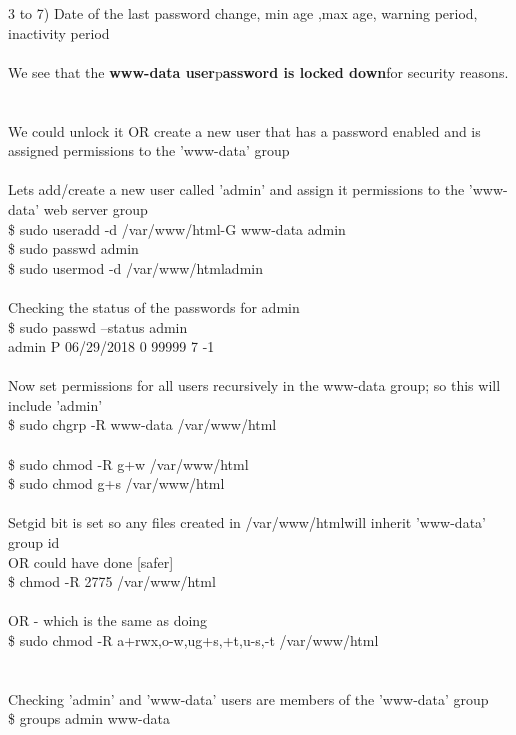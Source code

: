 \documentclass[10pt,a4paper]{article}
\begin{document}
{{{{{{{{{{{{{{{{{{{{{3 to 7) Date of the last password change, min age ,max age, warning period, inactivity period\\
\\
We see that the \textbf{www-data user}}{\large  p\textbf{assword is locked down}}{\large  for security reasons.\\
\\
\\
We could unlock it OR create a new user that has a password enabled and is assigned permissions to the 'www-data' group\\
\\
Lets add/create a new user called 'admin' and assign it permissions to the 'www-data' web server group\\
\$ sudo useradd -d /var/www/html}{\large  -G www-data admin\\
\$ sudo passwd admin\\
\$ sudo usermod -d /var/www/html}{\large  admin\\
\\
Checking the status of the passwords for admin\\
\$ sudo passwd --status admin\\
admin P 06/29/2018 0 99999 7 -1\\
\\
Now set permissions for all users recursively in the www-data group; so this will include 'admin'\\
\$ sudo chgrp -R www-data /var/www/html}{\large \\
\\
\$ sudo chmod -R g+w /var/www/html}{\large \\
\$ sudo chmod g+s /var/www/html}{\large \\
\\
Setgid bit is set so any files created in /var/www/html}{\large  will inherit 'www-data' group id\\
OR could have done [safer]\\
\$ chmod -R 2775 /var/www/html}{\large \\
\\
OR - which is the same as doing\\
\$ sudo chmod -R a+rwx,o-w,ug+s,+t,u-s,-t  /var/www/html}{\large \\
\\
\\
Checking  'admin' and 'www-data' users are members of the 'www-data' group\\
\$ groups admin www-data\\
}}}}}}}}}}}}}}}}}}}}}
\end{document}

